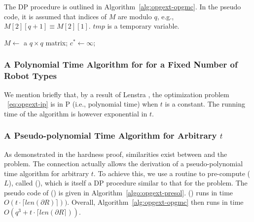 The DP procedure is outlined in Algorithm~\ref{alg:opgext-opgmc}. In the pseudo code, 
it is assumed that indices of $M$ are modulo $q$, e.g., $M[2][q+1] 
\equiv M[2][1]$. $tmp$ is a temporary variable. 
\begin{comment}
\jy{Generally mathematicians and theoretical computer scientists use 
	$\ell_1, \ldots, \ell_t$ instead of $\ell_1, \ell_2, \ldots, \ell_t$. The later is more 
	redundant. Also, normally we use ldots instead of cdots. I changed $C$ to $M$ since 
    $C$ is used elsewhere. I changed $==$ to $=$ to save space.}
\end{comment}
\begin{algorithm}
    \DontPrintSemicolon
    $M \leftarrow$ a $q\times q$ matrix; $c^* \leftarrow \infty$; \;
    \caption{\opgmcdp}
    \label{alg:opgmc}
\end{algorithm}

\subsubsection{A Polynomial Time Algorithm for \opgmc for a Fixed Number of Robot Types}
We mention briefly that, by a result of Lenstra \cite{lenstra1983integer}, the optimization problem 
~\eqref{eq:opgext-ip} is in P (i.e., polynomial time) when $t$ is a constant. The running time of 
the algorithm \cite{lenstra1983integer} is however exponential in $t$. 

\subsubsection{A Pseudo-polynomial Time Algorithm for Arbitrary $t$}
As demonstrated in the hardness proof, similarities exist between \opg and the \knapsack 
problem. The connection actually allows the derivation of a pseudo-polynomial time algorithm
for arbitrary $t$. To achieve this, we use a routine to pre-compute \sol($L$), called 
\presol(), which is itself a DP procedure similar to that for the \knapsack problem. The 
pseudo code of \presol() is given in Algorithm~\ref{algo:opgext-presol}.
\presol() runs in time $O(t\cdot\lceil len(\partial R)\rceil))$. Overall, 
Algorithm~\ref{alg:opgext-opgmc} then runs in time $O(q^3+t\cdot\lceil len(\partial R\rceil))$.

